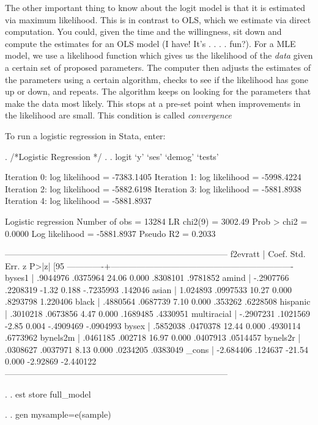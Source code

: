 \documentclass[12pt]{article}
\begin{document}
The other important thing to know about the logit model is that it is
estimated via maximum likelihood. This is in contrast to OLS, which we
estimate via direct computation. You could, given the time and the
willingness, sit down and compute the estimates for an OLS model (I
have! It's . . . .  fun?). For a MLE model, we use a likelihood
function which gives us the likelihood of the \emph{data} given a
certain set of proposed parameters. The computer then adjusts the
estimates of the parameters using a certain algorithm, checks to see
if the likelihood has gone up or down, and repeats. The algorithm
keeps on looking for the parameters that make the data most
likely. This stops at a pre-set point when improvements in the
likelihood are small. This condition is called \textit{convergence}

To run a logistic regression in Stata, enter:

\begin{stlog}
  
. /*Logistic Regression */
. 
. logit `y' `ses' `demog' `tests'

Iteration 0:   log likelihood = -7383.1405  
Iteration 1:   log likelihood = -5998.4224  
Iteration 2:   log likelihood = -5882.6198  
Iteration 3:   log likelihood = -5881.8938  
Iteration 4:   log likelihood = -5881.8937  

Logistic regression                               Number of obs   =      13284
                                                  LR chi2(9)      =    3002.49
                                                  Prob > chi2     =     0.0000
Log likelihood = -5881.8937                       Pseudo R2       =     0.2033

------------------------------------------------------------------------------
    f2evratt |      Coef.   Std. Err.      z    P>|z|     [95%
-------------+----------------------------------------------------------------
      byses1 |   .9044976   .0375964    24.06   0.000     .8308101    .9781852
       amind |  -.2907766   .2208319    -1.32   0.188    -.7235993     .142046
       asian |   1.024893   .0997533    10.27   0.000     .8293798    1.220406
       black |   .4880564   .0687739     7.10   0.000      .353262    .6228508
    hispanic |   .3010218   .0673856     4.47   0.000     .1689485    .4330951
 multiracial |  -.2907231   .1021569    -2.85   0.004    -.4909469   -.0904993
       bysex |   .5852038   .0470378    12.44   0.000     .4930114    .6773962
    bynels2m |   .0461185    .002718    16.97   0.000     .0407913    .0514457
    bynels2r |   .0308627   .0037971     8.13   0.000     .0234205    .0383049
       _cons |  -2.684406    .124637   -21.54   0.000     -2.92869   -2.440122
------------------------------------------------------------------------------

. 
. est store full_model

. 
. gen mysample=e(sample)

\end{stlog}
\end{document}
